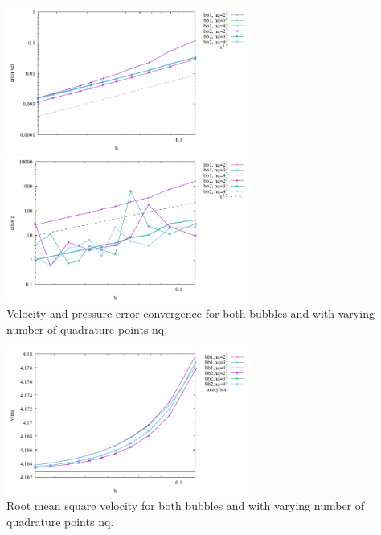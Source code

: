 \begin{center}
\includegraphics[width=8cm]{python_codes/fieldstone_75/results/burst/errors_v.pdf}
\includegraphics[width=8cm]{python_codes/fieldstone_75/results/burst/errors_p.pdf}\\
{\captionfont Velocity and pressure error convergence for both bubbles and with varying number of 
quadrature points nq.}
\end{center}


\begin{center}
\includegraphics[width=8cm]{python_codes/fieldstone_75/results/burst/vrms.pdf}\\
{\captionfont Root mean square velocity for both bubbles and with varying number of   
quadrature points nq.}
\end{center}


